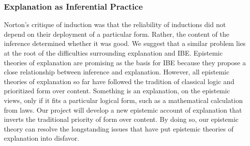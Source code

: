 \documentclass{article}[11pt]
\renewcommand{\degree}{\ensuremath{^\circ}}
\begin{document}
\subsubsection*{Explanation as Inferential Practice}


Norton's critique of induction was that the reliability of inductions did not depend on their deployment of a particular form.  Rather, the content of the inference determined whether it was good.  We suggest that a similar problem lies at the root of the difficulties surrounding explanation and IBE.  Epistemic theories of explanation are promising as the basis for IBE because they propose a close relationship between inference and explanation.  However, all epistemic theories of explanation so far have followed the tradition of classical logic and prioritized form over content.  Something is an explanation, on the epistemic views, only if it fits a particular logical form, such as a mathematical calculation from laws. Our project will develop a new epistemic account of explanation that inverts the traditional priority of form over content.  By doing so, our epistemic theory can resolve the longstanding issues that have put epistemic theories of explanation into disfavor.


\end{document}
